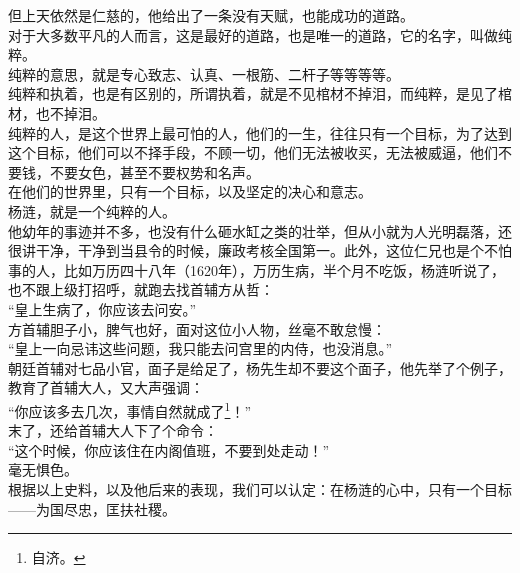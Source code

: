\begin{multicols}{\theparacolNo}
但上天依然是仁慈的，他给出了一条没有天赋，也能成功的道路。\\

对于大多数平凡的人而言，这是最好的道路，也是唯一的道路，它的名字，叫做纯粹。\\

纯粹的意思，就是专心致志、认真、一根筋、二杆子等等等等。\\

纯粹和执着，也是有区别的，所谓执着，就是不见棺材不掉泪，而纯粹，是见了棺材，也不掉泪。\\

纯粹的人，是这个世界上最可怕的人，他们的一生，往往只有一个目标，为了达到这个目标，他们可以不择手段，不顾一切，他们无法被收买，无法被威逼，他们不要钱，不要女色，甚至不要权势和名声。\\

在他们的世界里，只有一个目标，以及坚定的决心和意志。\\

杨涟，就是一个纯粹的人。\\

他幼年的事迹并不多，也没有什么砸水缸之类的壮举，但从小就为人光明磊落，还很讲干净，干净到当县令的时候，廉政考核全国第一。此外，这位仁兄也是个不怕事的人，比如万历四十八年（1620年），万历生病，半个月不吃饭，杨涟听说了，也不跟上级打招呼，就跑去找首辅方从哲：\\

“皇上生病了，你应该去问安。”\\

方首辅胆子小，脾气也好，面对这位小人物，丝毫不敢怠慢：\\

“皇上一向忌讳这些问题，我只能去问宫里的内侍，也没消息。”\\

朝廷首辅对七品小官，面子是给足了，杨先生却不要这个面子，他先举了个例子，教育了首辅大人，又大声强调：\\

“你应该多去几次，事情自然就成了\footnote{自济。}！”\\

末了，还给首辅大人下了个命令：\\

“这个时候，你应该住在内阁值班，不要到处走动！”\\

毫无惧色。\\

根据以上史料，以及他后来的表现，我们可以认定：在杨涟的心中，只有一个目标——为国尽忠，匡扶社稷。\\


\end{multicols}
